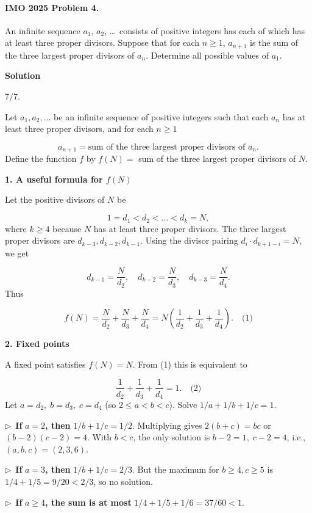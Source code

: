 \documentclass{llmxive}
\providecommand{\solutionheading}[1]{\par\smallskip\noindent\textbf{#1}\par}
\providecommand{\compactbullet}[1]{\par\noindent$\triangleright$~#1\par}
\begin{document}
\paragraph{IMO 2025 Problem 4.}
\begin{mdframed}[style=mdpurplebox,frametitle={IMO 2025 Problem 4}]
An infinite sequence $a_1$, $a_2$, \dots\ consists of positive integers
has each of which has at least three proper divisors.
Suppose that for each $n\geq 1$,
$a_{n+1}$ is the sum of the three largest proper divisors of $a_n$.
Determine all possible values of $a_1$.
\end{mdframed}
\solutionheading{Solution}
\begin{remark*}
  7/7.
\end{remark*}
Let \(a_1,a_2,\dots\) be an infinite sequence of positive integers such that each \(a_n\) has at least three proper divisors, and for each \(n\ge 1\)\par
\[
a_{n+1}=\text{sum of the three largest proper divisors of }a_n.
\]
Define the function \(f\) by \(f(N) =\) sum of the three largest proper divisors of \(N\).\par
\smallskip
\solutionheading{1. A useful formula for \(f(N)\)}
Let the positive divisors of \(N\) be\par
\[
1=d_1<d_2<\dots<d_k=N,
\]
where \(k\ge4\) because \(N\) has at least three proper divisors. The three largest proper divisors are \(d_{k-3}, d_{k-2}, d_{k-1}\). Using the divisor pairing \(d_i\cdot d_{k+1-i}=N\), we get\par
\[
d_{k-1}=\frac{N}{d_2},\quad d_{k-2}=\frac{N}{d_3},\quad d_{k-3}=\frac{N}{d_4}.
\]
Thus\par
\[
f(N)=\frac{N}{d_2}+\frac{N}{d_3}+\frac{N}{d_4}=N\left(\frac{1}{d_2}+\frac{1}{d_3}+\frac{1}{d_4}\right). \quad\text{(1)}
\]
\smallskip
\solutionheading{2. Fixed points}
A fixed point satisfies \(f(N)=N\). From (1) this is equivalent to\par
\[
\frac{1}{d_2}+\frac{1}{d_3}+\frac{1}{d_4}=1. \quad\text{(2)}
\]
Let \(a=d_2,\;b=d_3,\;c=d_4\) (so \(2\le a<b<c\)). Solve \(1/a+1/b+1/c=1\).\par
\compactbullet{\textbf{If }\(a=2\)\textbf{, then }\(1/b+1/c=1/2\). Multiplying gives \(2(b+c)=bc\) or \((b-2)(c-2)=4\). With \(b<c\), the only solution is \(b-2=1,\;c-2=4\), i.e., \((a,b,c)=(2,3,6)\).}
\compactbullet{\textbf{If }\(a=3\)\textbf{, then }\(1/b+1/c=2/3\). But the maximum for \(b\ge4,c\ge5\) is \(1/4+1/5=9/20<2/3\), so no solution.}
\compactbullet{\textbf{If }\(a\ge4\)\textbf{, the sum is at most }\(1/4+1/5+1/6=37/60<1\).}
\end{document}
